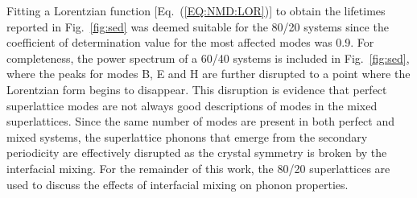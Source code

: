 \documentclass[aps,prb,preprint,preprintnumbers,amsmath,amssymb,floatfix,superscriptaddress]{revtex4}
\begin{document}
Fitting a Lorentzian function [Eq.~(\ref{EQ:NMD:LOR})] to obtain the lifetimes reported in Fig.~\ref{fig:sed} was deemed suitable for the 80/20 systems since the coefficient of determination value \cite{Cowpe20081066} for the most affected modes was 0.9. For completeness, the power spectrum of a 60/40 systems is included in Fig.~\ref{fig:sed}, where the peaks for modes B, E and H are further disrupted to a point where the Lorentzian form begins to disappear. This disruption is evidence that perfect superlattice modes are not always good descriptions of modes in the mixed superlattices. Since the same number of modes are present in both perfect and mixed systems, the superlattice phonons that emerge from the secondary periodicity are effectively disrupted as the crystal symmetry is broken by the interfacial mixing. For the remainder of this work, the 80/20 superlattices are used to discuss the effects of interfacial mixing on phonon properties.
\renewcommand{\topfraction}{1.0}
\begin{figure*}%
\begin{center}
\renewcommand{\figure}{Fig.}
\caption{Power spectra for selected modes of the $4\times 4$ perfect and mixed superlattices [indicated by the labeled gray square markers in Figs.~\ref{fig:dispersion}(a)-\ref{fig:dispersion}(c)]. Dark blue corresponds to a perfect superlattice, red corresponds to mixing of 80/20, and light blue corresponds to mixing of 60/40. Reported lifetimes calculated from the fitting of the Lorentzian functions (not shown) are also included. By removing a single MD seed, the average uncertainty in the fitting was determined to be 7.5\%.}
\label{fig:sed}
\end{center}
\end{figure*}
\end{document}

